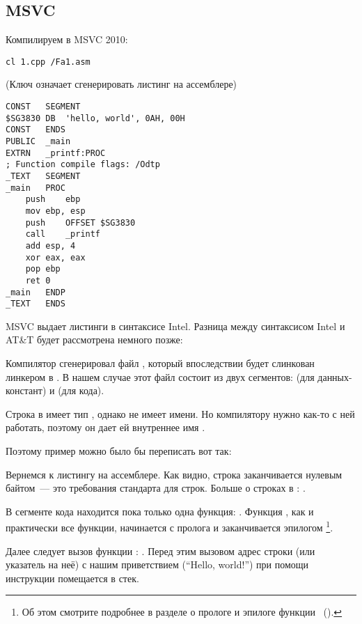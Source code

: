 \subsection{MSVC}

Компилируем в MSVC 2010:

\begin{lstlisting}
cl 1.cpp /Fa1.asm
\end{lstlisting}

(Ключ  означает сгенерировать листинг на ассемблере)

\begin{lstlisting}[caption=MSVC 2010]
CONST	SEGMENT
$SG3830	DB	'hello, world', 0AH, 00H
CONST	ENDS
PUBLIC	_main
EXTRN	_printf:PROC
; Function compile flags: /Odtp
_TEXT	SEGMENT
_main	PROC
	push	ebp
	mov	ebp, esp
	push	OFFSET $SG3830
	call	_printf
	add	esp, 4
	xor	eax, eax
	pop	ebp
	ret	0
_main	ENDP
_TEXT	ENDS
\end{lstlisting}

\ifx\LITE\undefined
MSVC выдает листинги в синтаксисе Intel.
Разница между синтаксисом Intel и AT\&T будет рассмотрена немного позже:
\fi

Компилятор сгенерировал файл , который впоследствии будет слинкован линкером в .
В нашем случае этот файл состоит из двух сегментов:  (для данных-констант) и  (для кода).

\label{string_is_const_char}
Строка  в \CCpp имеет тип \cite[p176, 7.3.2]{TCPPPL}, однако не имеет имени.
Но компилятору нужно как-то с ней работать, поэтому он дает ей внутреннее имя .

Поэтому пример можно было бы переписать вот так:



Вернемся к листингу на ассемблере. Как видно, строка заканчивается нулевым байтом~--- это требования стандарта \CCpp для строк.
Больше о строках в \CCpp: .

В сегменте кода  находится пока только одна функция: \main{}.
Функция \main, как и практически все функции, начинается с пролога и заканчивается эпилогом
\footnote{Об этом смотрите подробнее в разделе о прологе и эпилоге функции ~().}.

Далее следует вызов функции \printf{}: .
Перед этим вызовом адрес строки (или указатель на неё) с нашим приветствием (``Hello, world!'') при помощи инструкции \PUSH помещается в стек.

